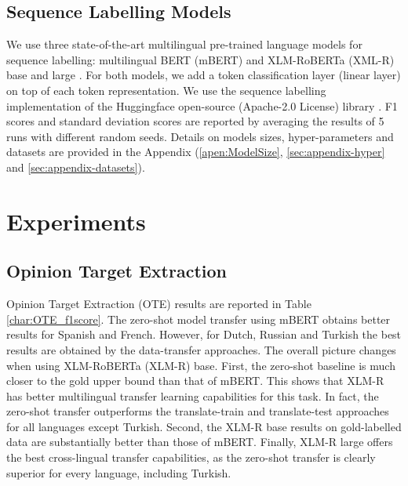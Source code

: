 \documentclass[11pt]{article}
\begin{document}
\subsection{Sequence Labelling Models}

We use three state-of-the-art multilingual pre-trained language models for sequence labelling: multilingual BERT (mBERT) \cite{DBLP:conf/naacl/DevlinCLT19} and XLM-RoBERTa (XML-R) base and large \cite{xlmr}. For both models, we add a token classification layer (linear layer) on top of each token representation. We use the sequence labelling implementation of the Huggingface open-source (Apache-2.0 License) library \cite{DBLP:journals/corr/abs-1910-03771}. 
F1 scores and standard deviation scores are reported by averaging the results
of 5 runs with different random seeds. Details on models sizes, hyper-parameters and datasets are provided in the Appendix
(\ref{apen:ModelSize}, \ref{sec:appendix-hyper} and \ref{sec:appendix-datasets}).

\section{Experiments}
\label{sec:Experiments}





\subsection{Opinion Target Extraction}
\label{sec:OTE}









Opinion Target Extraction (OTE) results are reported in Table \ref{char:OTE_f1score}. The zero-shot model transfer using mBERT obtains better results for Spanish and French. However, for Dutch, Russian and Turkish the best results are obtained by the data-transfer approaches. 
The overall picture changes when using XLM-RoBERTa (XLM-R) base. First, the zero-shot baseline is much closer to the gold upper bound than that of mBERT. This shows that XLM-R has better multilingual transfer learning capabilities for this task. In fact, the zero-shot transfer outperforms the translate-train and translate-test approaches for all languages except Turkish. Second, the XLM-R base results on gold-labelled data are substantially better than those of mBERT. Finally, XLM-R large offers the best cross-lingual transfer capabilities, as the zero-shot transfer is clearly superior for every language, including Turkish. 
\end{document}
